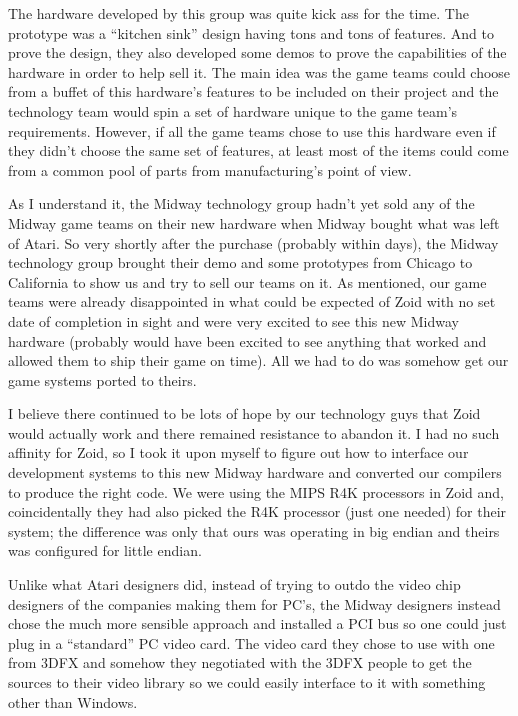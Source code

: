 The hardware developed by this group was quite kick ass for the time. The prototype was a “kitchen sink” design having tons and tons of features. And to prove the design, they also developed some demos to prove the capabilities of the hardware in order to help sell it. The main idea was the game teams could choose from a buffet of this hardware's features to be included on their project and the technology team would spin a set of hardware unique to the game team's requirements. However, if all the game teams chose to use this hardware even if they didn't choose the same set of features, at least most of the items could come from a common pool of parts from manufacturing's point of view.

As I understand it, the Midway technology group hadn't yet sold any of the Midway game teams on their new hardware when Midway bought what was left of Atari. So very shortly after the purchase (probably within days), the Midway technology group brought their demo and some prototypes from Chicago to California to show us and try to sell our teams on it. As mentioned, our game teams were already disappointed in what could be expected of Zoid with no set date of completion in sight and were very excited to see this new Midway hardware (probably would have been excited to see anything that worked and allowed them to ship their game on time). All we had to do was somehow get our game systems ported to theirs. 

I believe there continued to be lots of hope by our technology guys that Zoid would actually work and there remained resistance to abandon it. I had no such affinity for Zoid, so I took it upon myself to figure out how to interface our development systems to this new Midway hardware and converted our compilers to produce the right code. We were using the MIPS R4K processors in Zoid and, coincidentally they had also picked the R4K processor (just one needed) for their system; the difference was only that ours was operating in big endian and theirs was configured for little endian. 

Unlike what Atari designers did, instead of trying to outdo the video chip designers of the companies making them for PC's, the Midway designers instead chose the much more sensible approach and installed a PCI bus so one could just plug in a “standard” PC video card. The video card they chose to use with one from 3DFX and somehow they negotiated with the 3DFX people to get the sources to their video library so we could easily interface to it with something other than Windows.

